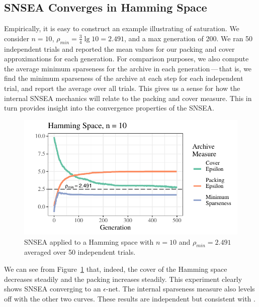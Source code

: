 \documentclass[twoside]{article}
\begin{document}
\subsection{SNSEA Converges in Hamming Space}
\label{subsec:hamming}

Empirically, it is easy to construct an example illustrating of saturation.  We consider $n=10$, $\rho_{min} = \frac{3}{4} \lg 10 = 2.491$, and a max generation of 200.  We ran 50 independent trials and reported the mean values for our packing and cover approximations for each generation.  For comparison purposes, we also compute the average minimum sparseness for the archive in each generation\,---\,that is, we find the minimum sparseness of the archive at each step for each independent trial, and report the average over all trials.  This gives us a sense for how the internal SNSEA mechanics will relate to the packing and cover measure.  This in turn provides insight into the convergence properties of the SNSEA.
%
\begin{figure}[t]
\includegraphics[width=1\textwidth]{Figures/hamming-500-n10-NOPOP.pdf}
\caption{\label{fig:hamming:nopop:n10} SNSEA applied to a Hamming space with $n=10$ and $\rho_{min} = 2.491$ averaged over 50 independent trials.}
\end{figure}
%
We can see from Figure~\ref{fig:hamming:nopop:n10} that, indeed, the cover of the Hamming space decreases steadily and the packing increases steadily.  This experiment clearly shows SNSEA converging to an $\epsilon$-net.  The internal sparseness measure also levels off with the other two curves.  These results are independent but consistent with \cite{Wiegand2019flairs}.  
\end{document}
